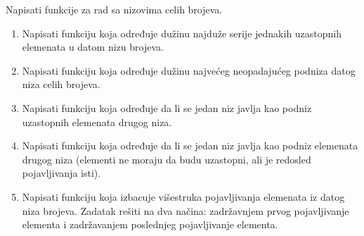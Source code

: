 

\begin{Exercise}[label=pv.bez_resenja_6] 
Napisati funkcije za rad sa nizovima celih brojeva. 
\begin{enumerate}
\item Napisati funkciju koja određuje dužinu najduže serije jednakih uzastopnih elemenata
u datom nizu brojeva.
\item Napisati funkciju koja određuje dužinu najvećeg neopadajućeg podniza datog niza celih
  brojeva. 
\item Napisati funkciju koja određuje da li se jedan niz javlja kao podniz uzastopnih elemenata drugog niza.
\item Napisati funkciju koja određuje da li se jedan niz javlja kao podniz elemenata drugog niza (elementi ne moraju da budu uzastopni, ali je redosled pojavljivanja isti).  
\item Napisati funkciju koja izbacuje višestruka pojavljivanja elemenata iz datog niza
  brojeva. Zadatak rešiti na dva načina: zadržavnjem prvog pojavljivanje elementa i zadržavanjem poslednjeg pojavljivanje elementa.  
\end{enumerate}
\end{Exercise}
\begin{Answer}[ref=pv.bez_resenja_6]
\end{Answer}


